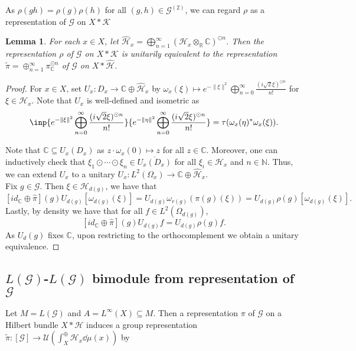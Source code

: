 \documentclass[a4paper,11pt]{article}
\numberwithin{equation}{section}
\newtheorem{lem}[thm]{Lemma}
\theoremstyle{definition}
\theoremstyle{remark}
\numberwithin{equation}{section}
\newcommand{\rG}{\mathcal{G}}
\newcommand{\C}{\mathbb{C}}
\def\N{\mathbb{N}}
\def\H{\mathcal H}
\def\K{\mathcal K}
\def\R{\mathbb{R}}
\newcommand{\U}{\mathcal{U}}
\def\sub{\subseteq}
\providecommand{\norm}[1]{\lVert#1\rVert}
\newcommand{\lr}[1]{\left(#1\right)}
\newcommand*\cls[1]{\overline{#1}}
\numberwithin{equation}{section}
\begin{document}
As $ \rho(gh) = \rho(g) \rho(h) $ for all $ (g,h)\in \rG^{(2)} $, we can regard $ \rho $ as a representation of $ \rG $ on $ X\ast \K $


\begin{lem}\label{fockspace}
  For each $ x\in X $, let $ \widehat{\H}_{x} = \bigoplus_{n=1}^{\infty}(\H_{x}\otimes_{\R}\C)^{\odot n} $. Then the representation $ \rho $ of $ \rG $ on $ X\ast \K $ is unitarily equivalent to the representation $ \widetilde{\pi} = \oplus_{n=1}^{\infty} \pi_{\C}^{\odot n} $ of $ \rG $ on $ X\ast \widehat{\H} $.
\end{lem}

\begin{proof}
  For $ x\in X $, set $ U_{x}:D_{x}\to \C\oplus \widehat{\H}_{x} $ by $ \omega_{x}(\xi)\mapsto e^{-\norm{\xi}^{2}}\bigoplus_{n=0}^{\infty}\frac{(i \sqrt{2} \xi)^{\odot n}}{n!} $ for $ \xi\in \H_{x} $. Note that $ U_{x} $ is well-defined and isometric as 
  $$
    \inp{e^{-\norm{\xi}^{2}}\bigoplus_{n=0}^{\infty}\frac{(i \sqrt{2} \xi)^{\odot n}}{n!}}{e^{-\norm{\eta}^{2}}\bigoplus_{n=0}^{\infty}\frac{(i \sqrt{2} \xi)^{\odot n}}{n!}} = \tau(\omega_{x}(\eta)^{*} \omega_{x}(\xi)).
  $$

  Note that $ \C\sub U_{x}(D_{x}) $ as $ z \cdot\omega_{x}(0)\mapsto z $ for all $ z\in \C $. Moreover, one can inductively check that $ \xi_{1}\odot \cdots \odot \xi_{n} \in \cls{U_{x}(D_{x})} $ for all $ \xi_{i}\in \H_{x} $ and $ n\in \N $. Thus, we can extend $ U_{x} $ to a unitary $ U_{x}: L^{2}(\Omega_{x})\to \C\oplus \widehat{\H}_{x} $.\\

  Fix $g\in \rG$. Then $\xi\in \H_{d(g)}$, we have that 
  \[
    [id_{\C}\oplus \widehat{\pi}](g) U_{d(g)} [\omega_{d(g)}(\xi)] =  U_{d(g)} \omega_{r(g)}(\pi(g)(\xi)) = U_{d(g)} \rho(g)[\omega_{d(g)}(\xi)].
  \]
    Lastly, by density we have that for all $f\in L^2(\Omega_{d(g)})$,
    \[
        [id_{\C}\oplus \widehat{\pi}](g) U_{d(g)} f =U_{d(g)} \rho(g)f.
    \]
    As $U_d(g)$ fixes $\C$, upon restricting to the orthocomplement we obtain a unitary equivalence.
\end{proof}

\subsection{$ L(\rG) $-$ L(\rG) $ bimodule from representation of $ \rG $}

Let $ M = L(\rG) $ and $ A = L^{\infty}(X) \sub M $. Then a representation $ \pi $ of $ \rG $ on a Hilbert bundle $ X\ast \H $ induces a group representation $ \widetilde{\pi}: [\rG]\to \U\lr{\int_{X}^{\oplus}\H_{x} \dd{\mu(x)}} $ by 
\end{document}
